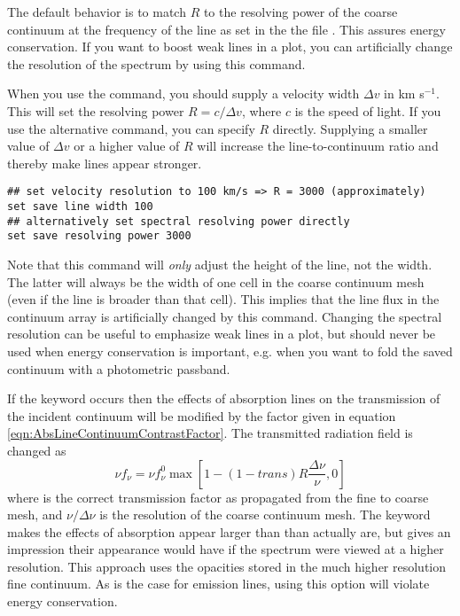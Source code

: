 \begin{description}
The
default behavior is to match $R$ to the resolving power of the coarse continuum
at the frequency of the line as set in the
the file . This assures energy
conservation. If you want to boost weak lines in a plot, you can artificially
change the resolution of the spectrum by using this command.

When you use the  command, you should supply a
velocity width $\Delta v$ in km s$^{-1}$. This will set the resolving power $R = c/\Delta v$,
where $c$ is the speed of light. If you use the alternative 
 command, you can specify $R$ directly. 
Supplying a smaller
value of $\Delta v$ or a higher value of $R$ will increase the line-to-continuum
ratio and thereby make lines appear stronger.
\begin{verbatim}
## set velocity resolution to 100 km/s => R = 3000 (approximately)
set save line width 100
## alternatively set spectral resolving power directly
set save resolving power 3000
\end{verbatim}

Note that this command will {\em only} adjust the height of the line, not the
width. The latter will always be the width of one cell in the coarse continuum mesh
(even if the line is broader than that cell). This implies that
the line flux in the continuum array is artificially changed by this command.
Changing the spectral resolution can be useful to emphasize weak lines in a plot,
but should never be used when energy conservation is important, e.g. when
you want to fold the saved continuum with a photometric passband.

If the keyword  occurs then the effects
of absorption lines on the transmission of the incident continuum
will be modified by the factor given in
equation \ref{eqn:AbsLineContinuumContrastFactor}.
The transmitted radiation field is changed as
\begin{equation}
\nu f_\nu   = \nu f_\nu ^0 \max \left[ {1 - \left( {1 - trans} \right)R\frac{\Delta\nu}{\nu}} , 0 \right]
\label{eqn:AbsLineContinuumContrastFactor}
\end{equation}
where  is the correct transmission factor as propagated
from the fine to coarse mesh, and $\nu/\Delta\nu$ is the resolution of the coarse continuum mesh.
The keyword  makes the effects of absorption appear larger than than
actually are, but gives an impression their appearance would have if
the spectrum were viewed at a higher resolution. This approach
uses the opacities stored in the much higher resolution fine continuum.
As is the case for emission lines, using this option will violate energy conservation.


\end{description}
